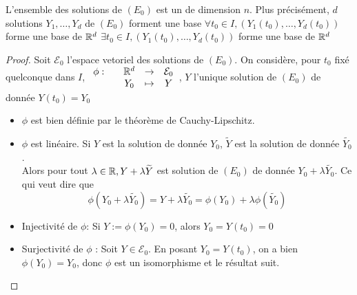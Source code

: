 \documentclass[]{report}
\begin{document}
\begin{cor}
    L'ensemble des solutions de $(E_0)$ est un \ev de dimension $n$. Plus précisément, $d$ solutions $Y_1,\ldots,Y_d$ de $(E_0)$ forment une base \ssi $\forall t_0\in I, (Y_1(t_0),\ldots,Y_d(t_0))$ forme une base de $\mathbb{R}^d$ \ssi $\exists t_0\in I,(Y_1(t_0),\ldots,Y_d(t_0))$ forme une base de $\mathbb{R}^d$
\end{cor}

\begin{proof}
    Soit $\mathcal{E}_0$ l'espace vetoriel des solutions de $(E_0)$. On considère, pour $t_0$ fixé quelconque dans $I$, $\begin{array}{ccccc} \phi : & & \mathbb{R}^d & \to & \mathcal{E}_0 \\ & & Y_0 & \mapsto & Y \end{array}$, $Y$ l'unique solution de $(E_0)$ de donnée $Y(t_0)=Y_0$
    \begin{itemize}
        \item $\phi$ est bien définie par le théorème de Cauchy-Lipschitz.
        \item $\phi$ est linéaire. Si $Y$ est la solution de donnée $Y_0$, $\widetilde{Y}$ est la solution de donnée $\widetilde{Y_0}$.\\
        Alors pour tout $\lambda\in \mathbb{R}, Y+\lambda \widetilde{Y}$ est solution de $(E_0)$ de donnée $Y_0+\lambda \widetilde{Y_0}$. Ce qui veut dire que 
        \[\phi(Y_0+\lambda \widetilde{Y_0})=Y+\lambda \widetilde{Y_0}=\phi(Y_0)+\lambda \phi(\widetilde{Y_0})\]
        \item Injectivité de $\phi$: Si $Y:=\phi(Y_0)=0$, alors $Y_0=Y(t_0)=0$
        \item Surjectivité de $\phi$ : Soit $Y\in \mathcal{E}_0$. En posant $Y_0=Y(t_0)$, on a bien $\phi(Y_0)=Y_0$, donc $\phi$ est un isomorphisme et le résultat suit. 
    \end{itemize} 
\end{proof}
\end{document}
